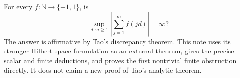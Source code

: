 For every $f:\mathbb N\to\{-1,1\}$, is
\[
 \sup_{d,m\geq1}\left|\sum_{j=1}^m f(jd)\right|=\infty?
\]
The answer is affirmative by Tao's discrepancy theorem. This note uses
its stronger Hilbert-space formulation as an external theorem, gives the
precise scalar and finite deductions, and proves the first nontrivial
finite obstruction directly. It does not claim a new proof of Tao's
analytic theorem.
